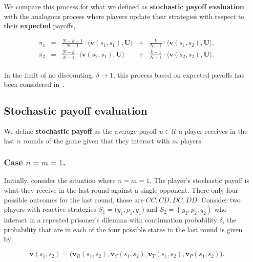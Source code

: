 \documentclass[11pt]{article}
\theoremstyle{plainCl1}
\theoremstyle{plainCl2}
\begin{document}
We compare this process for what we defined as {\bf stochastic payoff
evaluation} with the analogous process where players update their strategies
with respect to their {\bf expected} payoffs,

\begin{equation} \label{eq:ExpPay}
\begin{array}{lcrcr}
\pi_1 &= &\displaystyle \frac{N\!-\!k\!-\!1}{N-1}\cdot \langle\mathbf{v}(s_1,s_1),\mathbf{U}\rangle	& + &\displaystyle\frac{k}{N-1}\cdot \langle\mathbf{v}(s_1,s_2),\mathbf{U}\rangle,\\[0.5cm]
\pi_2 &= &\displaystyle\frac{N-k}{N-1}\cdot \langle\mathbf{v}(s_2,s_1),\mathbf{U}\rangle & + &\displaystyle\frac{k-1}{N-1}\cdot \langle\mathbf{v}(s_2,s_2),\mathbf{U}\rangle.\\
\end{array}
\end{equation}

In the limit of no discounting, $\delta\!\rightarrow\! 1$, this process based on
expected payoffs has been considered in~\cite{imhof2010stochastic}.

\subsection{Stochastic payoff evaluation}

We define {\bf stochastic payoff} as the average payoff $u\!\in\! \mathcal{U}$ a player
receives in the last \(n\) rounds of the game given that they interact with
\(m\) players.

\subsubsection*{Case \(n=m=1\).}

Initially, consider the situation where \(n=m=1\). The player's stochastic
payoff is what they receive in the last round against a single opponent. There
only four possible outcomes for the last round, those are \(CC, CD, DC, DD\).
Consider two players with reactive strategies $S_1\!=\!(y_1, p_1, q_1$) and
$S_2\!=\!(y_2,p_2,q_2)$ who interact in a repeated prisoner's dilemma with
continuation probability $\delta$, the probability that are in each of the
four possible states in the last round is given by:

\begin{equation}
    \mathbf{v}(s_1,s_2)\!=\!\Big(\mathbf{v}_{R}(s_1,s_2),\mathbf{v}_{S}(s_1,s_2),\mathbf{v}_{T}(s_1,s_2),\mathbf{v}_{P}(s_1,s_2)\Big).
\end{equation}
\end{document}
